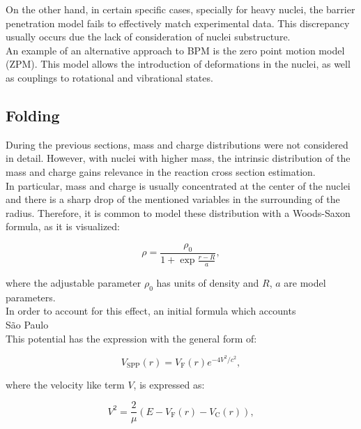 \documentclass[openany]{book}
\begin{document}
On the other hand, in certain specific cases, specially for heavy nuclei, the barrier penetration model fails to effectively match experimental data. This discrepancy usually occurs due the lack of consideration of nuclei substructure. \\

An example of an alternative approach to BPM is the zero point motion model (ZPM). This model allows the introduction of deformations in the nuclei, as well as couplings to rotational and vibrational states. 


\subsection{Folding} \label{sub:potential_folding}

During the previous sections, mass and charge distributions were not considered in detail. However, with nuclei with higher mass, the intrinsic distribution of the mass and charge gains relevance in the reaction cross section estimation. \\

In particular, mass and charge is usually concentrated at the center of the nuclei and there is a sharp drop of the mentioned variables in the surrounding of the radius. Therefore, it is common to model these distribution with a Woods-Saxon formula, as it is visualized: 

\begin{equation}
	\rho = \frac{\rho_0}{1 + \exp{\frac{r - R}{a}}},
\end{equation}

where the adjustable parameter $\rho_0$ has units of density and $R$, $a$ are model parameters. \\

In order to account for this effect, an initial formula which accounts  \\

São Paulo \cite{chamon_2007} \\

This potential has the expression with the general form of:

\begin{equation} \label{eq:potential_SaoPaulo}
	V_{\mathrm{SPP}} (r) = V_{\mathrm{F}} (r)e^{-4V^2/c^2},
\end{equation}

where the velocity like term $V$, is expressed as: 

\begin{equation} \label{eq:potential_SaoPaulo_speed}
	V^2 = \frac{2}{\mu} \left( E - V_{\mathrm{F}}(r) - V_{\mathrm{C}}(r) \right),
\end{equation}
\end{document}
